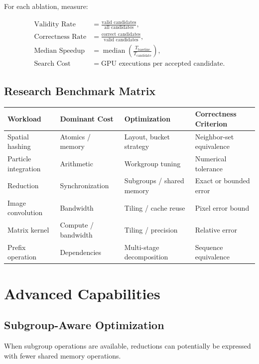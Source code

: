\documentclass[11pt,a4paper,oneside]{report}
\begin{document}
For each ablation, measure:

\begin{align}
\text{Validity Rate} &= \frac{\text{valid candidates}}{\text{all candidates}},\\
\text{Correctness Rate} &= \frac{\text{correct candidates}}{\text{valid candidates}},\\
\text{Median Speedup} &= \operatorname{median}\left(\frac{T_{\mathrm{baseline}}}{T_{\mathrm{candidate}}}\right),\\
\text{Search Cost} &= \text{GPU executions per accepted candidate}.
\end{align}

\section{Research Benchmark Matrix}

\begin{longtable}{p{}p{}p{}p{}}
\toprule
\textbf{Workload} & \textbf{Dominant Cost} & \textbf{Optimization} & \textbf{Correctness Criterion}\\
\midrule
Spatial hashing & Atomics / memory & Layout, bucket strategy & Neighbor-set equivalence\\
Particle integration & Arithmetic & Workgroup tuning & Numerical tolerance\\
Reduction & Synchronization & Subgroups / shared memory & Exact or bounded error\\
Image convolution & Bandwidth & Tiling / cache reuse & Pixel error bound\\
Matrix kernel & Compute / bandwidth & Tiling / precision & Relative error\\
Prefix operation & Dependencies & Multi-stage decomposition & Sequence equivalence\\
\bottomrule
\end{longtable}

\chapter{Advanced Capabilities}

\section{Subgroup-Aware Optimization}

When subgroup operations are available, reductions can potentially be expressed with fewer shared
memory operations.
\end{document}
